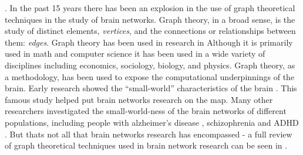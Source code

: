 .
In the past 15 years there has been an explosion in the use of graph theoretical techniques in the study of brain networks\cite{bullmore09}. Graph theory, in a broad sense, is the study of distinct elements, \textit{vertices}, and the connections or relationships between them: \textit{edges}. Graph theory has been used in research in Although it is primarily used in math and computer science it has been used in a wide variety of disciplines including economics, sociology, biology, and physics. Graph theory, as a methodology, has been used to expose the computational underpinnings of the brain. Early research showed the ``small-world'' characteristics of the brain \cite{watts98}. This famous study helped put brain networks research on the map. Many other researchers investigated the small-world-ness of the brain networks of different populations, including people with alzheimer's disease \cite{starn07, sanz10, zhao12}, schizophrenia \cite{liou08} and ADHD \cite{wang09}. But thats not all that brain networks research has encompassed - a full review of graph theoretical techniques used in brain network research can be seen in \cite{sporns10}. 

